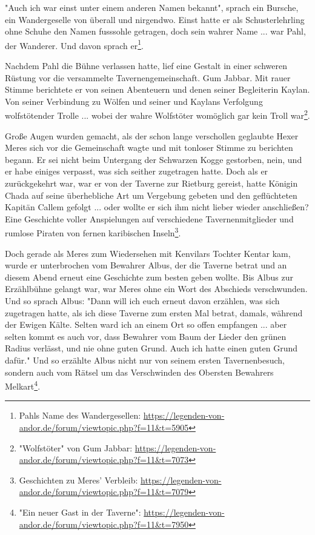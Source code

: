"Auch ich war einst unter einem anderen Namen bekannt", sprach ein Bursche, ein Wandergeselle von überall und nirgendwo. Einst hatte er als Schusterlehrling ohne Schuhe den Namen fusssohle getragen, doch sein wahrer Name ... war Pahl, der Wanderer. Und davon sprach er\footnote{Pahls Name des Wandergesellen: \url{https://legenden-von-andor.de/forum/viewtopic.php?f=11&t=5905}}.

Nachdem Pahl die Bühne verlassen hatte, lief eine Gestalt in einer schweren Rüstung vor die versammelte Tavernengemeinschaft. Gum Jabbar. Mit rauer Stimme berichtete er von seinen Abenteuern und denen seiner Begleiterin Kaylan. Von seiner Verbindung zu Wölfen und seiner und Kaylans Verfolgung wolfstötender Trolle ... wobei der wahre Wolfstöter womöglich gar kein Troll war\footnote{"Wolfstöter" von Gum Jabbar: \url{https://legenden-von-andor.de/forum/viewtopic.php?f=11&t=7073}}.

Große Augen wurden gemacht, als der schon lange verschollen geglaubte Hexer Meres sich vor die Gemeinschaft wagte und mit tonloser Stimme zu berichten begann. Er sei nicht beim Untergang der Schwarzen Kogge gestorben, nein, und er habe einiges verpasst, was sich seither zugetragen hatte. Doch als er zurückgekehrt war, war er von der Taverne zur Rietburg gereist, hatte Königin Chada auf seine überhebliche Art um Vergebung gebeten und den geflüchteten Kapitän Callem gefolgt ... oder wollte er sich ihm nicht lieber wieder anschließen? Eine Geschichte voller Anspielungen auf verschiedene Tavernenmitglieder und rumlose Piraten von fernen karibischen Inseln\footnote{Geschichten zu Meres' Verbleib: \url{https://legenden-von-andor.de/forum/viewtopic.php?f=11&t=7079}}.

Doch gerade als Meres zum Wiedersehen mit Kenvilars Tochter Kentar kam, wurde er unterbrochen vom Bewahrer Albus, der die Taverne betrat und an diesem Abend erneut eine Geschichte zum besten geben wollte. Bis Albus zur Erzählbühne gelangt war, war Meres ohne ein Wort des Abschieds verschwunden. Und so sprach Albus: "Dann will ich euch erneut davon erzählen, was sich zugetragen hatte, als ich diese Taverne zum ersten Mal betrat, damals, während der Ewigen Kälte. Selten ward ich an einem Ort so offen empfangen ... aber selten kommt es auch vor, dass Bewahrer vom Baum der Lieder den grünen Radius verlässt, und nie ohne guten Grund. Auch ich hatte einen guten Grund dafür." Und so erzählte Albus nicht nur von seinem ersten Tavernenbesuch, sondern auch vom Rätsel um das Verschwinden des Obersten Bewahrers Melkart\footnote{"Ein neuer Gast in der Taverne": \url{https://legenden-von-andor.de/forum/viewtopic.php?f=11&t=7950}}.

